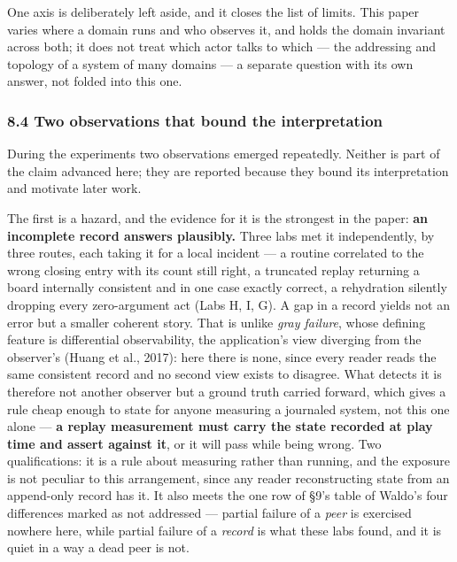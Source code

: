 \documentclass[
]{article}
\newcounter{none} %
\begin{document}
One axis is deliberately left aside, and it closes the list of limits.
This paper varies where a domain runs and who observes it, and holds the
domain invariant across both; it does not treat which actor talks to
which --- the addressing and topology of a system of many domains --- a
separate question with its own answer, not folded into this one.

\subsubsection{8.4 Two observations that bound the
interpretation}\label{two-observations-that-bound-the-interpretation}

During the experiments two observations emerged repeatedly. Neither is
part of the claim advanced here; they are reported because they bound
its interpretation and motivate later work.

The first is a hazard, and the evidence for it is the strongest in the
paper: \textbf{an incomplete record answers plausibly.} Three labs met
it independently, by three routes, each taking it for a local incident
--- a routine correlated to the wrong closing entry with its count still
right, a truncated replay returning a board internally consistent and in
one case exactly correct, a rehydration silently dropping every
zero-argument act (Labs H, I, G). A gap in a record yields not an error
but a smaller coherent story. That is unlike \emph{gray failure}, whose
defining feature is differential observability, the application's view
diverging from the observer's (Huang et al., 2017): here there is none,
since every reader reads the same consistent record and no second view
exists to disagree. What detects it is therefore not another observer
but a ground truth carried forward, which gives a rule cheap enough to
state for anyone measuring a journaled system, not this one alone ---
\textbf{a replay measurement must carry the state recorded at play time
and assert against it}, or it will pass while being wrong. Two
qualifications: it is a rule about measuring rather than running, and
the exposure is not peculiar to this arrangement, since any reader
reconstructing state from an append-only record has it. It also meets
the one row of §9's table of Waldo's four differences marked as not
addressed --- partial failure of a \emph{peer} is exercised nowhere
here, while partial failure of a \emph{record} is what these labs found,
and it is quiet in a way a dead peer is not.
\end{document}
